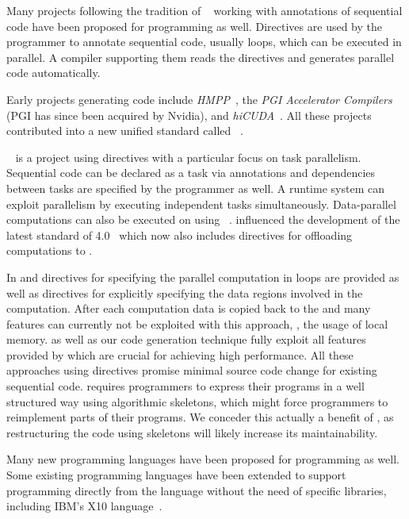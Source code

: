 \bigskip

Many projects following the tradition of \emph{\OpenMP}~\cite{OpenMP} working with annotations of sequential code have been proposed for \GPU programming as well.
Directives are used by the programmer to annotate sequential code, usually loops, which can be executed in parallel.
A compiler supporting them reads the directives and generates parallel code automatically.

Early projects generating \GPU code include \emph{HMPP}~\cite{DolbeauBiBo2007}, the \emph{PGI Accelerator Compilers} (PGI has since been acquired by Nvidia), and \emph{hiCUDA}~\cite{HanA11}.
All these projects contributed into a new unified standard called \emph{\OpenACC}~\cite{OpenACC}.

\emph{\OmpSs}~\cite{ElangovanBP12,DuranABLMMP11} is a project using directives with a particular focus on task parallelism.
Sequential code can be declared as a task via annotations and dependencies between tasks are specified by the programmer as well.
A runtime system can exploit parallelism by executing independent tasks simultaneously.
Data-parallel computations can also be executed on \GPUs using \OpenCL~\cite{ElangovanBP12}.
\OmpSs influenced the development of the latest standard of \emph{\OpenMP} 4.0~\cite{OpenMP} which now also includes directives for offloading computations to \GPUs.

In \OpenACC and  directives for specifying the parallel computation in loops are provided as well as directives for explicitly specifying the data regions involved in the computation.
After each computation data is copied back to the \CPU and many \GPU features can currently not be exploited with this approach, \eg, the usage of local memory.
\SkelCL as well as our code generation technique fully exploit all features provided by \GPUs which are crucial for achieving high performance.
All these approaches using directives promise minimal source code change for existing sequential code.
\SkelCL requires programmers to express their programs in a well structured way using algorithmic skeletons, which might force programmers to reimplement parts of their programs.
We conceder this actually a benefit of \SkelCL, as restructuring the code using skeletons will likely increase its maintainability.

\bigskip

Many new programming languages have been proposed for \GPU programming as well.
Some existing programming languages have been extended to support \GPU programming directly from the language without the need of specific libraries, including IBM's X10 language~\cite{TakeuchiMaKaHoSuSuOn2011}.

